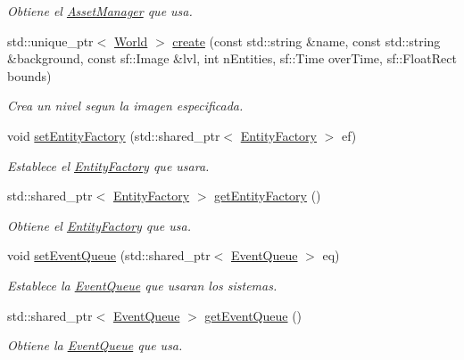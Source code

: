 \begin{DoxyCompactItemize}
\begin{DoxyCompactList}\small\item\em Obtiene el \hyperlink{classant_1_1_asset_manager}{Asset\+Manager} que usa. \end{DoxyCompactList}\item 
std\+::unique\+\_\+ptr$<$ \hyperlink{classant_1_1_world}{World} $>$ \hyperlink{classant_1_1_world_factory_aa5be33ba3755dcd849d55f5ac8f64d8e}{create} (const std\+::string \&name, const std\+::string \&background, const sf\+::\+Image \&lvl, int n\+Entities, sf\+::\+Time over\+Time, sf\+::\+Float\+Rect bounds)
\begin{DoxyCompactList}\small\item\em Crea un nivel segun la imagen especificada. \end{DoxyCompactList}\item 
void \hyperlink{classant_1_1_world_factory_ab72d9d99bf005a10402c296ed8ec0d05}{set\+Entity\+Factory} (std\+::shared\+\_\+ptr$<$ \hyperlink{classant_1_1_entity_factory}{Entity\+Factory} $>$ ef)
\begin{DoxyCompactList}\small\item\em Establece el \hyperlink{classant_1_1_entity_factory}{Entity\+Factory} que usara. \end{DoxyCompactList}\item 
std\+::shared\+\_\+ptr$<$ \hyperlink{classant_1_1_entity_factory}{Entity\+Factory} $>$ \hyperlink{classant_1_1_world_factory_a5221d294fc01541a3859eb7ed8ed57e1}{get\+Entity\+Factory} ()
\begin{DoxyCompactList}\small\item\em Obtiene el \hyperlink{classant_1_1_entity_factory}{Entity\+Factory} que usa. \end{DoxyCompactList}\item 
void \hyperlink{classant_1_1_world_factory_a18ece24ada51e6f8d27649fb7635f514}{set\+Event\+Queue} (std\+::shared\+\_\+ptr$<$ \hyperlink{classant_1_1_event_queue}{Event\+Queue} $>$ eq)
\begin{DoxyCompactList}\small\item\em Establece la \hyperlink{classant_1_1_event_queue}{Event\+Queue} que usaran los sistemas. \end{DoxyCompactList}\item 
std\+::shared\+\_\+ptr$<$ \hyperlink{classant_1_1_event_queue}{Event\+Queue} $>$ \hyperlink{classant_1_1_world_factory_a5438acbbbb7b5046c35e061714629daf}{get\+Event\+Queue} ()
\begin{DoxyCompactList}\small\item\em Obtiene la \hyperlink{classant_1_1_event_queue}{Event\+Queue} que usa. \end{DoxyCompactList}\item 

\end{DoxyCompactItemize}
